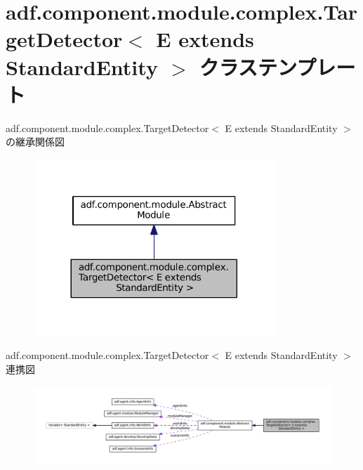 \hypertarget{classadf_1_1component_1_1module_1_1complex_1_1TargetDetector}{}\section{adf.\+component.\+module.\+complex.\+Target\+Detector$<$ E extends Standard\+Entity $>$ クラステンプレート}
\label{classadf_1_1component_1_1module_1_1complex_1_1TargetDetector}


adf.\+component.\+module.\+complex.\+Target\+Detector$<$ E extends Standard\+Entity $>$ の継承関係図
\nopagebreak
\begin{figure}[H]
\begin{center}
\leavevmode
\includegraphics[width=257pt]{classadf_1_1component_1_1module_1_1complex_1_1TargetDetector__inherit__graph}
\end{center}
\end{figure}


adf.\+component.\+module.\+complex.\+Target\+Detector$<$ E extends Standard\+Entity $>$ 連携図
\nopagebreak
\begin{figure}[H]
\begin{center}
\leavevmode
\includegraphics[width=350pt]{classadf_1_1component_1_1module_1_1complex_1_1TargetDetector__coll__graph}
\end{center}
\end{figure}
